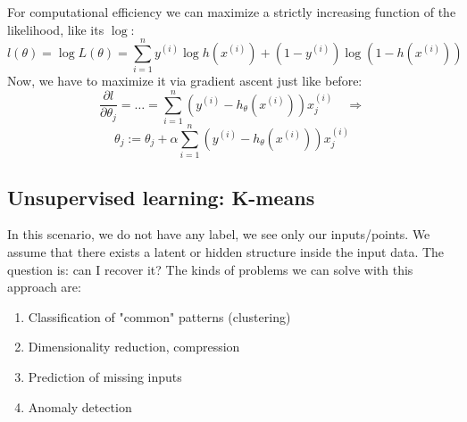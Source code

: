 For computational efficiency we can maximize a strictly increasing function of the likelihood, like its $\log$:
\begin{equation}
l(\theta) = \log L(\theta) = \sum_{i=1}^{n} y^{(i)}\log h(x^{(i)}) + (1-y^{(i)})\log(1-h(x^{(i)}))
\end{equation}
Now, we have to maximize it via gradient ascent just like before:
\begin{equation*}
\dfrac{\partial l}{\partial \theta_j}= \dots = \sum_{i=1}^{n}(y^{(i)}-h_\theta (x^{(i)}))x^{(i)}_j \quad \Rightarrow
\end{equation*}
\begin{equation}
\theta_{j} := \theta_{j} + \alpha\sum_{i=1}^{n}(y^{(i)} - h_{\theta}(x^{(i)}))x_{j}^{(i)}
\end{equation}

\subsection{Unsupervised learning: K-means}

In this scenario, we do not have any label, we see only our inputs/points. We assume that there exists a latent or hidden structure inside the input data. The question is: can I recover it? 
The kinds of problems we can solve with this approach are:
\begin{enumerate}
    \item Classification of "common" patterns (clustering)
    \item Dimensionality reduction, compression
    \item Prediction of missing inputs
    \item Anomaly detection
\end{enumerate}

